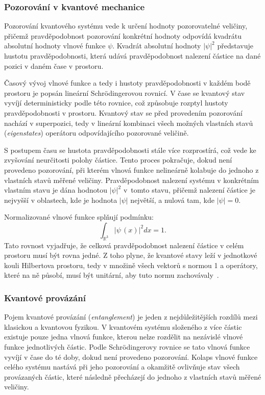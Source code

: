 \subsubsection*{Pozorování v kvantové mechanice}
Pozorování kvantového systému vede k určení hodnoty pozorovatelné veličiny, přičemž pravděpodobnost pozorování konkrétní hodnoty odpovídá kvadrátu absolutní hodnoty vlnové funkce $\psi$.
Kvadrát absolutní hodnoty $\left| \psi \right|^2$ představuje hustotu pravděpodobnosti, která udává pravděpodobnost nalezení částice na dané pozici v daném čase v prostoru. 
    
Časový vývoj vlnové funkce a tedy i hustoty pravděpodobnosti v každém bodě prostoru je popsán lineární Schrödingerovou rovnicí. 
V čase se kvantový stav vyvíjí deterministicky podle této rovnice, což způsobuje rozptyl hustoty pravděpodobnosti v prostoru. 
Kvantový stav se před provedením pozorování nachází v superpozici, tedy v lineární kombinaci všech možných vlastních stavů (\emph{eigenstates}) operátoru odpovídajícího pozorované veličině. 
    
S postupem času se hustota pravděpodobnosti stále více rozprostírá, což vede ke zvyšování neurčitosti polohy částice. 
Tento proces pokračuje, dokud není provedeno pozorování, při kterém vlnová funkce nelineárně kolabuje do jednoho z vlastních stavů měřené veličiny. 
Pravděpodobnost nalezení systému v konkrétním vlastním stavu je dána hodnotou $\left| \psi \right|^2$ v~tomto stavu, přičemž nalezení částice je nejvyšší v oblastech, kde je hodnota $\left| \psi \right|$ největší, a nulová tam, kde $\left| \psi \right| = 0$.
    
Normalizované vlnové funkce splňují podmínku:
\begin{equation*}
    \int_{\mathbb{R}^3} \left|\psi\,(x)\right|^2 dx = 1.    
\end{equation*}
Tato rovnost vyjadřuje, že celková pravděpodobnost nalezení částice v celém prostoru musí být rovna jedné.
Z toho plyne, že kvantové stavy leží v jednotkové kouli Hilbertova prostoru, tedy v množině všech vektorů s normou 1 a operátory, které na ně působí, musí být unitární, aby tuto normu zachovávaly~\cite{NaturalComputing}.

\subsubsection*{Kvantové provázání}
Pojem kvantové provázání (\emph{entanglement}) je jeden z nejdůležitějších rozdílů mezi klasickou a kvantovou fyzikou. 
V kvantovém systému složeného z více částic existuje pouze jedna vlnová funkce, kterou nelze rozdělit na nezávislé vlnové funkce jednotlivých částic. 
Podle Schrödingerovy rovnice se tato vlnová funkce vyvíjí v čase do té doby, dokud není provedeno pozorování.
Kolaps vlnové funkce celého systému nastává při jeho pozorování a okamžitě ovlivňuje stav všech provázaných částic, které následně přecházejí do jednoho z vlastních stavů měřené veličiny.

